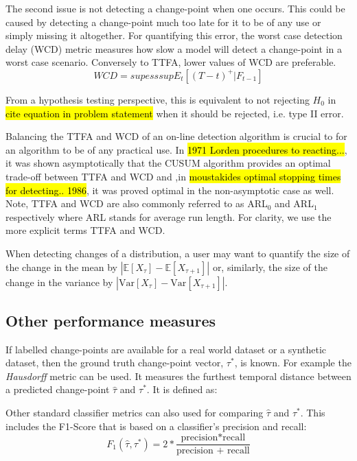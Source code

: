 The second issue is not detecting a change-point when one occurs. This could be caused by detecting a change-point much too late for it to be of any use or simply missing it altogether. For quantifying this error, the worst case detection delay (WCD) metric measures how slow a model will detect a  change-point in a worst case scenario. Conversely to TTFA, lower values of WCD are preferable.
\begin{equation}
WCD = sup esssup E_t[(T-t)^+ | F_{t-1}]
\end{equation}

From a hypothesis testing perspective, this is equivalent to not rejecting $H_0$ in \hl{cite equation in problem statement} when it should be rejected, i.e. type II error.

Balancing the TTFA and WCD of an on-line detection algorithm is crucial to for an algorithm to be of any practical use. In \hl{1971 Lorden procedures to reacting...}, it was shown asymptotically that the CUSUM algorithm provides an optimal trade-off between TTFA and WCD and ,in \hl{moustakides optimal stopping times for detecting.. 1986}, it was proved optimal in the non-asymptotic case as well. Note, TTFA and WCD are also commonly referred to as ARL$_0$ and ARL$_1$ respectively where ARL stands for average run length. For clarity, we use the more explicit terms TTFA and WCD.

When detecting changes of a distribution, a user may want to quantify the size of the change in the mean by
$|\mathbb{E}[X_{\tau}]-\mathbb{E}[X_{\tau+1}]|$ or, similarly, the size of the change in the variance by $|\text{Var}[X_{\tau}]-\text{Var}[X_{\tau+1}]|$.

\subsection{Other performance measures}

If labelled change-points are available for a real world dataset or a synthetic dataset, then the ground truth change-point vector, $\tau^*$, is known. For example the \textit{Hausdorff} metric can be used. It measures the furthest temporal distance between a predicted change-point $\hat{\tau}$ and $\tau^*$. It is defined as:

Other standard classifier metrics can also used for comparing $\hat{\tau}$ and $\tau^*$. This includes the  F1-Score that is based on a classifier's precision and recall:
\begin{equation}
F_1(\hat{\tau}, \tau^*) = 2 * \frac{\text{precision*recall}}{\text{precision + recall}}
\end{equation}

